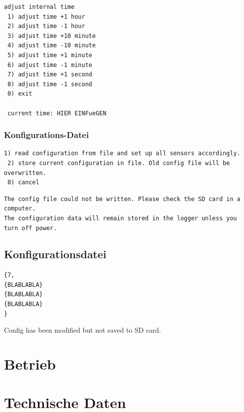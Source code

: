 \begin{lstlisting}[caption=Untermenü Uhrzeit einstellen, label=list.settime]
adjust internal time
 1) adjust time +1 hour
 2) adjust time -1 hour
 3) adjust time +10 minute
 4) adjust time -10 minute
 5) adjust time +1 minute
 6) adjust time -1 minute
 7) adjust time +1 second
 8) adjust time -1 second
 0) exit

 current time: HIER EINFueGEN
\end{lstlisting}

\subsubsection{Konfigurations-Datei}
\begin{lstlisting}[caption=Untermenü Konfigurationsdatei, label=list.config]
 1) read configuration from file and set up all sensors accordingly.
 2) store current configuration in file. Old config file will be overwritten.
 0) cancel
\end{lstlisting}

\begin{lstlisting}[caption=Fehlermeldung beim Speichern der Konfigurationsdatei, label=list.configerror]
The config file could not be written. Please check the SD card in a computer.
The configuration data will remain stored in the logger unless you turn off power.
\end{lstlisting}

\subsection{Konfigurationsdatei}
\begin{lstlisting}[caption=Beispiel einer Konfigurationsdatei, label=list.configfile]
{7,
{BLABLABLA}
{BLABLABLA}
{BLABLABLA}
}
\end{lstlisting}

Config has been modified but not saved to SD card.

\section{Betrieb}


\section{Technische Daten}